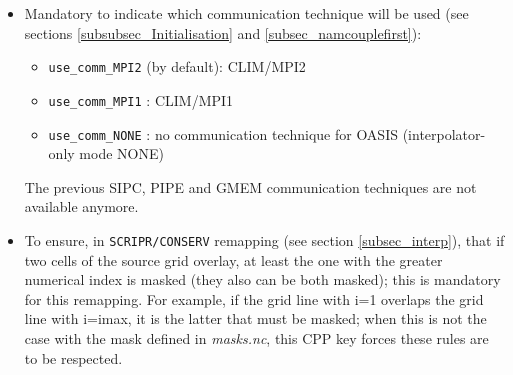 \begin{itemize}

\item Mandatory to indicate which communication technique will be used
  (see sections \ref{subsubsec_Initialisation} and \ref{subsec_namcouplefirst}):
  \begin{itemize}
  \item {\tt use\_comm\_MPI2} (by default): CLIM/MPI2 
  \item {\tt use\_comm\_MPI1} : CLIM/MPI1
  \item {\tt use\_comm\_NONE} : no communication technique for OASIS
    (interpolator-only mode NONE)
  \end{itemize}
  The previous SIPC, PIPE and GMEM communication techniques are not 
  available anymore.




  
\item To ensure, in {\tt SCRIPR/CONSERV} remapping (see section
  \ref{subsec_interp}), that if two cells of the source grid overlay,
  at least the one with the greater numerical index is masked (they
  also can be both masked); this is mandatory for this remapping. For
  example, if the grid line with i=1 overlaps the grid line with
  i=imax, it is the latter that must be masked; when this is not the
  case with the mask defined in {\it masks.nc}, this CPP key forces
  these rules are to be respected.


\end{itemize}
